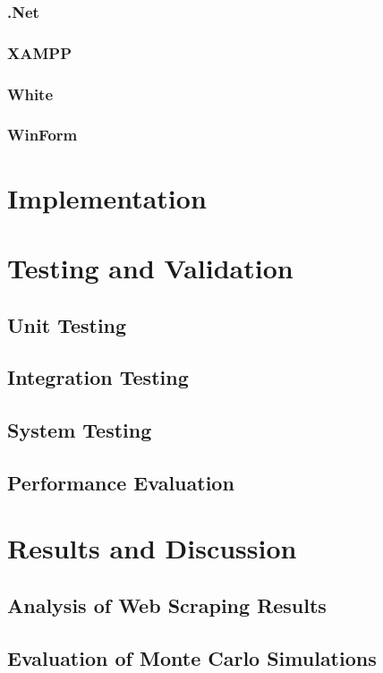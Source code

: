 \documentclass{thesis-ekf}
\theoremstyle{definition}
\theoremstyle{remark}
\begin{document}
{\subsection{.Net}
\subsection{XAMPP}
\subsection{White}
\subsection{WinForm}








\chapter{Implementation}

\chapter{Testing and Validation} \label{ch-testing}

\section{Unit Testing}
\section{Integration Testing}
\section{System Testing}
\section{Performance Evaluation}

\chapter{Results and Discussion}
\section{Analysis of Web Scraping Results}
\section{Evaluation of Monte Carlo Simulations}
}
\end{document}
